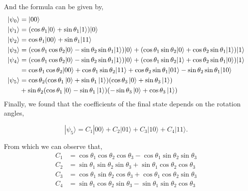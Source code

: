 \documentclass[11p]{article}
\begin{document}
And the formula can be given by,
\begin{align*}
|\psi_0\rangle &= |00 \rangle \\
|\psi_1\rangle &= (\cos\theta_1|0\rangle + \sin\theta_1|1\rangle)|0\rangle\\
|\psi_2\rangle & = \cos\theta_1|00\rangle + \sin\theta_1|11\rangle\\
|\psi_3\rangle &=(\cos\theta_1\cos\theta_2|0\rangle - \sin\theta_2\sin\theta_1|1\rangle)|0\rangle + (\cos\theta_1\sin\theta_2|0\rangle + \cos\theta_2\sin\theta_1|1\rangle)|1\rangle\\
|\psi_4\rangle &=(\cos\theta_1\cos\theta_2|0\rangle - \sin\theta_2\sin\theta_1|1\rangle)|0\rangle + (\cos\theta_1\sin\theta_2|1\rangle + \cos\theta_2\sin\theta_1|0\rangle)|1\rangle\\
&=\cos\theta_1\cos\theta_2|00\rangle + \cos\theta_1\sin\theta_2|11\rangle + \cos\theta_2\sin\theta_1|01\rangle- \sin\theta_2\sin\theta_1|10\rangle\\
|\psi_5\rangle&=\cos\theta_2(\cos\theta_1\ket{0}+\sin\theta_1\ket{1})(\cos\theta_3\ket{0}+\sin\theta_3\ket{1})\\
&+\sin\theta_2(\cos\theta_1\ket{0}-\sin\theta_1\ket{1})(-\sin\theta_3\ket{0}+\cos\theta_3\ket{1})\\
\end{align*}
Finally, we found that the coefficients of the final state depends on the rotation angles,

\[
    |\psi_5\rangle= C_1|00\rangle + C_2|01\rangle + C_3|10\rangle +C_4 |11\rangle.
\]

From which we can observe that,
\[
    \begin{aligned}
        C_1 &= 
        \cos \theta_1 \cos \theta_2 \cos \theta_3-\cos \theta_1 \sin \theta_2 \sin \theta_3\\
        C_2 &= 
        \sin \theta_1 \sin \theta_2 \sin \theta_3+\sin \theta_1 \cos \theta_2 \cos \theta_3\\
        C_3 &=
        \cos \theta_1 \sin \theta_2 \cos \theta_3+\cos \theta_1 \cos \theta_2 \sin \theta_3\\
        C_4 &= 
        \sin \theta_1 \cos \theta_2 \sin \theta_3-\sin \theta_1 \sin \theta_2 \cos \theta_3
    \end{aligned}
\]
\end{document}
